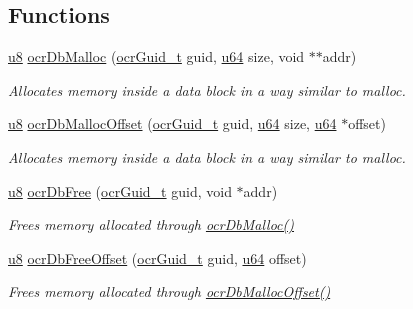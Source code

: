 \subsection*{Functions}
\begin{DoxyCompactItemize}
\item
\hyperlink{group__OCRTypesGeneral_ga92c50087ca0e64fa93fc59402c55f8ca}{u8} \hyperlink{group__OCRDataBlock_ga8aa85542741b3f9e81ce1b48ee72b711}{ocr\-Db\-Malloc} (\hyperlink{group__OCRTypesGeneral_gacde3883d1ce245c051133c2c3aa82fc8}{ocr\-Guid\-\_\-t} guid, \hyperlink{group__OCRTypesGeneral_ga3f7e2bcbb0b4c338f3c4f6c937cd4234}{u64} size, void $\ast$$\ast$addr)
\begin{DoxyCompactList}\small\item\em Allocates memory {\itshape inside} a data block in a way similar to malloc. \end{DoxyCompactList}

\item
\hyperlink{group__OCRTypesGeneral_ga92c50087ca0e64fa93fc59402c55f8ca}{u8} \hyperlink{group__OCRDataBlock_ga9fdb9d09d5e7875453870e7c52e524ee}{ocr\-Db\-Malloc\-Offset} (\hyperlink{group__OCRTypesGeneral_gacde3883d1ce245c051133c2c3aa82fc8}{ocr\-Guid\-\_\-t} guid, \hyperlink{group__OCRTypesGeneral_ga3f7e2bcbb0b4c338f3c4f6c937cd4234}{u64} size, \hyperlink{group__OCRTypesGeneral_ga3f7e2bcbb0b4c338f3c4f6c937cd4234}{u64} $\ast$offset)
\begin{DoxyCompactList}\small\item\em Allocates memory {\itshape inside} a data block in a way similar to malloc. \end{DoxyCompactList}

\item
\hyperlink{group__OCRTypesGeneral_ga92c50087ca0e64fa93fc59402c55f8ca}{u8} \hyperlink{group__OCRDataBlock_ga41a15d63d118ebae3f13e86284bd929c}{ocr\-Db\-Free} (\hyperlink{group__OCRTypesGeneral_gacde3883d1ce245c051133c2c3aa82fc8}{ocr\-Guid\-\_\-t} guid, void $\ast$addr)
\begin{DoxyCompactList}\small\item\em Frees memory allocated through \hyperlink{group__OCRDataBlock_ga8aa85542741b3f9e81ce1b48ee72b711}{ocr\-Db\-Malloc()} \end{DoxyCompactList}

\item
\hyperlink{group__OCRTypesGeneral_ga92c50087ca0e64fa93fc59402c55f8ca}{u8} \hyperlink{group__OCRDataBlock_gad937f3dca78f1f728b9ab49f48b2da44}{ocr\-Db\-Free\-Offset} (\hyperlink{group__OCRTypesGeneral_gacde3883d1ce245c051133c2c3aa82fc8}{ocr\-Guid\-\_\-t} guid, \hyperlink{group__OCRTypesGeneral_ga3f7e2bcbb0b4c338f3c4f6c937cd4234}{u64} offset)
\begin{DoxyCompactList}\small\item\em Frees memory allocated through \hyperlink{group__OCRDataBlock_ga9fdb9d09d5e7875453870e7c52e524ee}{ocr\-Db\-Malloc\-Offset()} \end{DoxyCompactList}


\end{DoxyCompactItemize}
